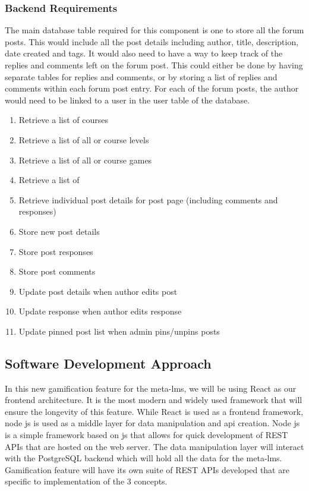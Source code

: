 \newpage

\subsubsection{Backend Requirements}
The main database table required for this component is one to store all the forum posts.
This would include all the post details including author, title, description, date created and tags.
It would also need to have a way to keep track of the replies and comments left on the forum post.
This could either be done by having separate tables for replies and comments, or by storing a list of replies and comments within each forum post entry.
For each of the forum posts, the author would need to be linked to a user in the user table of the database.

\begin{enumerate}
    \item Retrieve a list of courses
    \item Retrieve a list of all or course levels
    \item Retrieve a list of all or course games
    \item Retrieve a list of 
    \item Retrieve individual post details for post page (including comments and responses)
    \item Store new post details
    \item Store post responses
    \item Store post comments
    \item Update post details when author edits post
    \item Update response when author edits response
    \item Update pinned post list when admin pins/unpins posts
\end{enumerate}

\subsection{Software Development Approach}
In this new gamification feature for the meta-lms, we will be using React as our frontend architecture. It is the most modern and widely used framework that will ensure the longevity of this feature.
While React is used as a frontend framework, node js is used as a middle layer for data manipulation and api creation. Node js is a simple framework based on js that allows for quick development of REST APIs that are hosted on the web server. The data manipulation layer will interact with the PostgreSQL backend which will hold all the data for the meta-lms.
Gamification feature will have its own suite of REST APIs developed that are specific to implementation of the 3 concepts.

